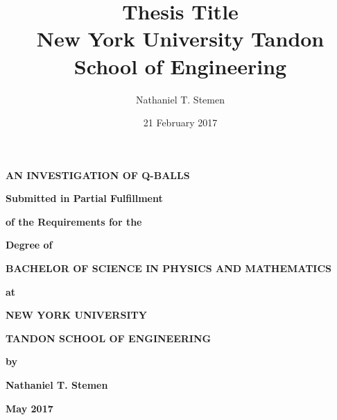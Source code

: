 \documentclass[12pt]{report}
\title{
	{Thesis Title}\\
	{\large New York University Tandon School of Engineering}\\
}
\author{Nathaniel T. Stemen}
\date{21 February 2017}
\theoremstyle{definition}
\begin{document}

\begin{center}
\begin{minipage}{0.75\linewidth}
    \centering
    \textbf{\Large{AN INVESTIGATION OF Q-BALLS}} \\ \vspace{1.cm}
    
    \textbf{Submitted in Partial Fulfillment} \\ \vspace{0.5cm}
    
    \textbf{of the Requirements for the} \\ \vspace{0.5cm}
    
    \textbf{Degree of} \\ \vspace{0.75cm}
    
    \textbf{BACHELOR OF SCIENCE IN PHYSICS AND MATHEMATICS}\\ \vspace{0.75cm}
    
    \textbf{at} \\ \vspace{0.5cm}
    
    \textbf{NEW YORK UNIVERSITY} \\ \vspace{0.5cm}
    
    \textbf{TANDON SCHOOL OF ENGINEERING} \\ \vspace{0.5cm}
    
    \textbf{by} \\ \vspace{0.5cm}
    
    \textbf{Nathaniel T. Stemen} \\ \vspace{0.5cm}
    
    \textbf{May 2017}
\end{minipage}
\end{center}
\clearpage

\newpage
\pagestyle{plain}

\noindent
\end{document}
